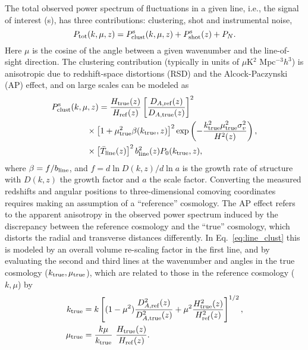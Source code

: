 \documentclass[twocolumn]{aastex631}
\newcommand{\be}{\begin{equation}}
\newcommand{\ee}{\end{equation}}
\begin{document}
The total observed power spectrum of fluctuations in a given line, i.e., the signal of interest (s), has three contributions: clustering, shot and instrumental noise,
\be
P_{\rm tot}(k,\mu,z) = P_{\rm clust}^{\rm s}(k,\mu,z) + P_{\rm shot}^{\rm s}(z) + P_N.
\ee
Here $\mu$ is the cosine of the angle between a given wavenumber and the line-of-sight direction. The clustering contribution (typically in units of $\mu$K$^2$ Mpc$^{-3}h^3$) is anisotropic due to redshift-space distortions (RSD) and the Alcock-Paczynski (AP) effect, and on large scales can be modeled as
\begin{align}\label{eq:line_clust}
P_{\rm clust}^{\rm s}(k,\mu,z) &= \frac{H_{\rm true}(z)}{H_{\rm ref}(z)}  \left[\frac{D_{A,{\rm ref}}(z)}{D_{A,{\rm true}}(z)}\right]^2 \notag \\
&\hspace{-.2in}\times \left[1+\mu_{\rm true}^2\beta(k_{\rm true},z)\right]^2 {\rm exp}\left(-\frac{k_{\rm true}^2 \mu_{\rm true}^2 \sigma_v^2}{H^2(z)}\right),\notag \\
&\hspace{-.2in}\times \left[\bar T_{\rm line}(z)\right]^2 b_{\rm line}^2(z) P_0(k_{\rm true},z),
\end{align}
where $\beta= f/b_{\rm line}$, and $f = d\ln D(k,z)/d\ln a$ is the growth rate of structure with $D(k,z)$ the growth factor and $a$ the scale factor. Converting the
measured redshifts and angular positions to three-dimensional comoving coordinates requires making an assumption of a ``reference'' cosmology. The AP effect refers to the apparent anisotropy in the observed power spectrum induced by the discrepancy between the reference cosmology and the ``true'' cosmology, which distorts the radial and transverse distances differently. In Eq.~\eqref{eq:line_clust} this is modeled by an overall volume re-scaling factor in the first line, and by evaluating the second and third lines at the wavenumber and angles in the true cosmology ($k_{\rm true}, \mu_{\rm true}$), which are related to those in the  reference cosmology ($k, \mu$) by
\begin{align}\label{eq:trueref}
k_{\rm true} &= k \left[(1-\mu^2) \frac{D_{A,{\rm ref}}^2(z)}{D_{A,{\rm true}}^2(z)} + \mu^2 \frac{H_{\rm true}^2(z)}{H_{\rm ref}^2(z)}\right]^{1/2},  \nonumber \\
\mu_{\rm true} &= \frac{k \mu }{k_{\rm true}} \ \frac{H_{\rm true}(z)}{H_{\rm ref}(z)}.
\end{align}
\end{document}
